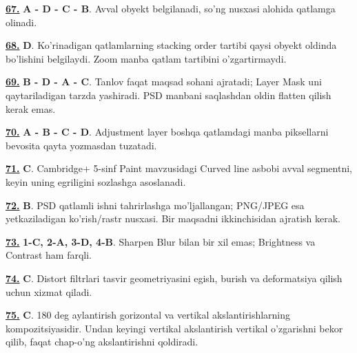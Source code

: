 \documentclass[10pt,a4paper,oneside]{article}
\begin{document}
\noindent\hyperlink{q67}{\textbf{67.}} \textbf{A - D - C - B}.  Avval obyekt belgilanadi, so'ng nusxasi alohida qatlamga olinadi.
\par\vspace{3mm}
\noindent\hyperlink{q68}{\textbf{68.}} \textbf{D}.  Ko'rinadigan qatlamlarning stacking order tartibi qaysi obyekt oldinda bo'lishini belgilaydi. Zoom manba qatlam tartibini o'zgartirmaydi.
\par\vspace{3mm}
\noindent\hyperlink{q69}{\textbf{69.}} \textbf{B - D - A - C}.  Tanlov faqat maqsad sohani ajratadi; Layer Mask uni qaytariladigan tarzda yashiradi. PSD manbani saqlashdan oldin flatten qilish kerak emas.
\par\vspace{3mm}
\noindent\hyperlink{q70}{\textbf{70.}} \textbf{A - B - C - D}.  Adjustment layer boshqa qatlamdagi manba piksellarni bevosita qayta yozmasdan tuzatadi.
\par\vspace{3mm}
\noindent\hyperlink{q71}{\textbf{71.}} \textbf{C}.  Cambridge+ 5-sinf Paint mavzusidagi Curved line asbobi avval segmentni, keyin uning egriligini sozlashga asoslanadi.
\par\vspace{3mm}
\noindent\hyperlink{q72}{\textbf{72.}} \textbf{B}.  PSD qatlamli ishni tahrirlashga mo'ljallangan; PNG/JPEG esa yetkaziladigan ko'rish/rastr nusxasi. Bir maqsadni ikkinchisidan ajratish kerak.
\par\vspace{3mm}
\noindent\hyperlink{q73}{\textbf{73.}} \textbf{1-C, 2-A, 3-D, 4-B}.  Sharpen Blur bilan bir xil emas; Brightness va Contrast ham farqli.
\par\vspace{3mm}
\noindent\hyperlink{q74}{\textbf{74.}} \textbf{C}.  Distort filtrlari tasvir geometriyasini egish, burish va deformatsiya qilish uchun xizmat qiladi.
\par\vspace{3mm}
\noindent\hyperlink{q75}{\textbf{75.}} \textbf{C}.  180 deg  aylantirish gorizontal va vertikal akslantirishlarning kompozitsiyasidir. Undan keyingi vertikal akslantirish vertikal o'zgarishni bekor qilib, faqat chap-o'ng akslantirishni qoldiradi.
\par\vspace{3mm}
\end{document}
